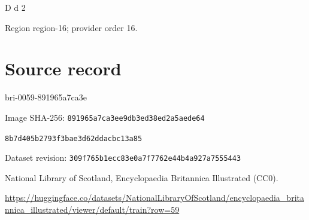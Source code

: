 \documentclass[11pt]{article}
\begin{document}
D d 2
\par

{\scriptsize\color{gray} Region region-16; provider order 16.\par}
\medskip
\newpage\section*{Source record}
bri-0059-891965a7ca3e\par
Image SHA-256: \texttt{891965a7ca3ee9db3ed38ed2a5aede64}\par\texttt{8b7d405b2793f3bae3d62ddacbc13a85}\par
Dataset revision: \texttt{309f765b1ecc83e0a7f7}\texttt{762e44b4a927a7555443}\par
National Library of Scotland, Encyclopaedia Britannica Illustrated (CC0).\par
\url{https://huggingface.co/datasets/NationalLibraryOfScotland/encyclopaedia_britannica_illustrated/viewer/default/train?row=59}
\end{document}
